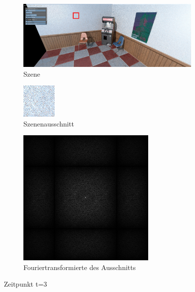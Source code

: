\begin{figure}[H]
    \begin{subfigure}{\textwidth}
        \centering \includegraphics[scale=.2]{content/TemporalerAlg/Bilder/Screenshotreihe/frame_t_4.0.png}
        \caption{Szene}
        \label{fig:Szene_t3}
    \end{subfigure}
    \begin{subfigure}{0.5\textwidth}
        \centering\includegraphics[width=0.5\linewidth]{content/TemporalerAlg/Bilder/Screenshotreihe/frame_t_4.0_64x64.png} 
        \caption{Szenenausschnitt}
        \label{fig:ausschnitt_t3}
    \end{subfigure}
    \begin{subfigure}{0.5\textwidth}
        \centering\includegraphics[width=0.5\linewidth]{content/TemporalerAlg/Bilder/Screenshotreihe/spektrum/frame_t_4.0_64x64_fourier.png}
        \caption{Fouriertransformierte des Ausschnitts}
        \label{fig:Fouriertransformierte_t3}
    \end{subfigure}
        \caption{Zeitpunkt t=3}
        \label{fig:Verlauf_t3}
\end{figure}

